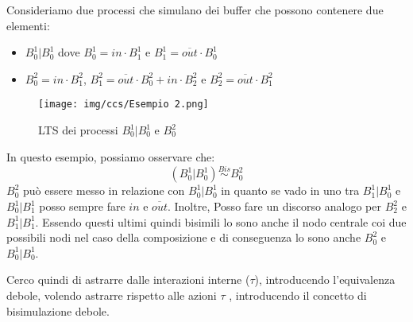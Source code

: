 \begin{esempio}
    Consideriamo due processi che simulano dei buffer che possono contenere due
    elementi:
    \begin{itemize}
        \item $B_0^1 | B_0^1$ dove $B_0^1 = in \cdot B_1^1$ e $B_1^1 = \overline{out} \cdot B_0^1$
        \item $B_0^2 = in \cdot B_1^2$, $B_1^2= \overline{out} \cdot B_0^2 + in \cdot B_2^2$ e $B_2^2 = \overline{out} \cdot B_1^2$
    \end{itemize}
    \begin{figure}[!ht]
        \centering
        \texttt{[image: img/ccs/Esempio 2.png]}
        \caption{LTS dei processi $B_0^1 | B_0^1$ e $B_0^2$}
    \end{figure}
    In questo esempio, possiamo osservare che: $$(B_0^1 | B_0^1) \stackrel{Bis}{\sim} B_0^2$$
    $B_0^2$ può essere messo in relazione con $B_0^1| B_0^1$ in quanto se vado
    in uno tra $B_1^1 | B_0^1$ e $B_0^1 | B_1^1$ posso sempre fare $in$ e $\overline{out}$.
    Inoltre, Posso fare un discorso analogo per $B_2^2$ e $B_1^1 | B_1^1$.
    Essendo questi ultimi quindi bisimili lo sono anche il nodo centrale coi
    due possibili nodi nel caso della composizione e di conseguenza lo sono
    anche $B_0^2$ e $B_0^1 | B_0^1$.
\end{esempio}
Cerco quindi di astrarre dalle interazioni interne ($\tau$), introducendo
l'equivalenza debole, volendo astrarre rispetto alle azioni $\tau$ , introducendo
il concetto di bisimulazione debole.

